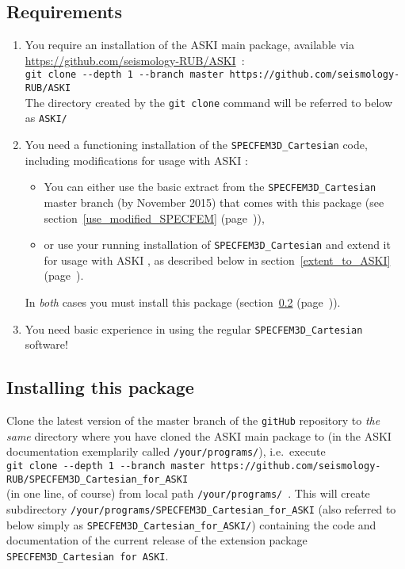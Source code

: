 \documentclass[12pt,a4paper]{article}
\newcommand{\lcode}[1]{\nolinkurl{#1}}
\newcommand{\ASKI}{ {\ttfamily ASKI} }
\newcommand{\myref}[1]{\ref{#1} (page~\pageref{#1})}
\begin{document}
\subsection{Requirements} %
\begin{enumerate}
 \item You require an installation of the \ASKI{} main package, available via
   \url{https://github.com/seismology-RUB/ASKI}~:\\
   \lcode{git clone --depth 1 --branch master https://github.com/seismology-RUB/ASKI}\\
   The directory created by the \lcode{git clone} command will be referred to 
   below as \lcode{ASKI/}
\item You need a functioning installation of the \lcode{SPECFEM3D_Cartesian} code, including 
   modifications for usage with \ASKI{}:
   \begin{itemize}
   \item You can either use the basic extract from the \lcode{SPECFEM3D_Cartesian} master branch
     (by November 2015) that comes with this package (see section~\myref{use_modified_SPECFEM}{}),
   \item or use your running installation of \lcode{SPECFEM3D_Cartesian} and extend it for usage 
     with \ASKI{}, as described below in section~\myref{extent_to_ASKI}{}.
   \end{itemize}
   In \emph{both} cases you must install this package (section~\myref{install_this_package}).

 \item You need basic experience in using the regular \lcode{SPECFEM3D_Cartesian} software!
\end{enumerate}

\subsection{Installing this package} \label{install_this_package}
Clone the latest version of the master branch of the \lcode{gitHub} repository to \emph{the same} directory 
where you have cloned the \ASKI{} main package to (in the \ASKI{} documentation exemplarily called 
\lcode{/your/programs/}), i.e.\ execute\\
\lcode{git clone --depth 1 --branch master https://github.com/seismology-RUB/SPECFEM3D_Cartesian_for_ASKI}\\
(in one line, of course) from local path \lcode{/your/programs/}~. 
This will create subdirectory \lcode{/your/programs/SPECFEM3D_Cartesian_for_ASKI} (also referred to below simply
as \lcode{SPECFEM3D_Cartesian_for_ASKI/}) containing
the code and documentation of the current release of the extension package \lcode{SPECFEM3D_Cartesian for ASKI}.
\end{document}
